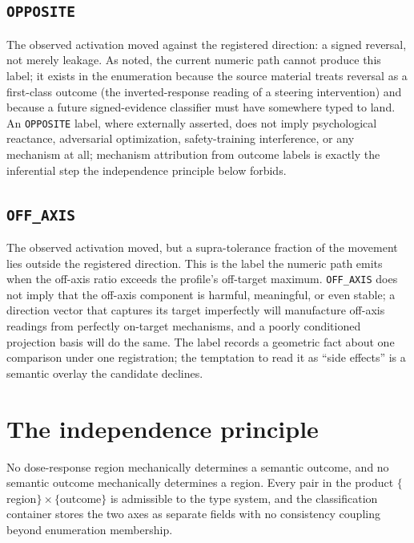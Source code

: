 \subsection{\texttt{OPPOSITE}}

The observed activation moved against the registered direction: a signed
reversal, not merely leakage. As noted, the current numeric path cannot
produce this label; it exists in the enumeration because the source material
treats reversal as a first-class outcome (the inverted-response reading of a
steering intervention) and because a future signed-evidence classifier must
have somewhere typed to land. An \texttt{OPPOSITE} label, where externally
asserted, does not imply psychological reactance, adversarial optimization,
safety-training interference, or any mechanism at all; mechanism attribution
from outcome labels is exactly the inferential step the independence
principle below forbids.

\subsection{\texttt{OFF\_AXIS}}

The observed activation moved, but a supra-tolerance fraction of the
movement lies outside the registered direction. This is the label the
numeric path emits when the off-axis ratio exceeds the profile's
off-target maximum. \texttt{OFF\_AXIS} does not imply that the off-axis
component is harmful, meaningful, or even stable; a direction vector that
captures its target imperfectly will manufacture off-axis readings from
perfectly on-target mechanisms, and a poorly conditioned projection basis
will do the same. The label records a geometric fact about one comparison
under one registration; the temptation to read it as ``side effects'' is a
semantic overlay the candidate declines.

\section{The independence principle}\label{ch07:sec:independence}

\begin{ruleenv}\label{ch07:rule:independence}
No dose-response region mechanically determines a semantic outcome, and no
semantic outcome mechanically determines a region. Every pair in the product
$\{$region$\} \times \{$outcome$\}$ is admissible to the type system, and the
classification container stores the two axes as separate fields with no
consistency coupling beyond enumeration membership.
\end{ruleenv}

